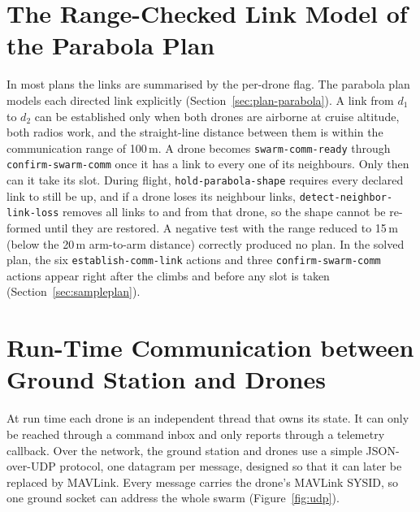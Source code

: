 \documentclass[11pt,a4paper,oneside]{report}
\newcommand{\code}[1]{\texttt{#1}}
\begin{document}
\section{The Range-Checked Link Model of the Parabola Plan}\label{sec:paracomm}
In most plans the links are summarised by the per-drone flag. The parabola plan models each
directed link explicitly (Section~\ref{sec:plan-parabola}). A link from $d_1$ to $d_2$ can be
established only when both drones are airborne at cruise altitude, both radios work, and the
straight-line distance between them is within the communication range of 100\,m. A drone
becomes \code{swarm-comm-ready} through \code{confirm-swarm-comm} once it has a link to every
one of its neighbours. Only then can it take its slot. During flight,
\code{hold-parabola-shape} requires every declared link to still be up, and if a drone loses its
neighbour links, \code{detect-neighbor-link-loss} removes all links to and from that drone, so
the shape cannot be re-formed until they are restored. A negative test with the range reduced to
15\,m (below the 20\,m arm-to-arm distance) correctly produced no plan. In the solved plan, the
six \code{establish-comm-link} actions and three \code{confirm-swarm-comm} actions appear right
after the climbs and before any slot is taken (Section~\ref{sec:sampleplan}).

\section{Run-Time Communication between Ground Station and Drones}
At run time each drone is an independent thread that owns its state. It can only be reached
through a command inbox and only reports through a telemetry callback. Over the network, the
ground station and drones use a simple JSON-over-UDP protocol, one datagram per message, designed
so that it can later be replaced by MAVLink. Every message carries the drone's MAVLink SYSID, so
one ground socket can address the whole swarm (Figure~\ref{fig:udp}).
\end{document}
